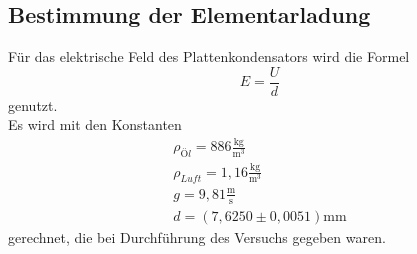 \subsection{Bestimmung der Elementarladung}

Für das elektrische Feld des Plattenkondensators wird die Formel
\begin{equation}
  E = \frac{U}{d}
\end{equation}
genutzt.\\
Es wird mit den Konstanten 
\begin{eqnarray}
  \rho_{Öl} = 886 \mathrm{\frac{kg}{m^3}}\\
  \rho_{Luft} = 1,16 \mathrm{\frac{kg}{m^3}}\\
  g = 9,81 \mathrm{\frac{m}{s}} \\
  d = (7,6250 \pm 0,0051) \mathrm{mm}
\end{eqnarray}
gerechnet, die bei Durchführung des Versuchs gegeben waren. \\